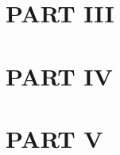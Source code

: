 \cleardoublepage %



\ctparttext{\blindtext} %

\part{PART III} %




\ctparttext{\blindtext} %

\part{PART IV} %



\part{PART V} %



\appendix
{}


